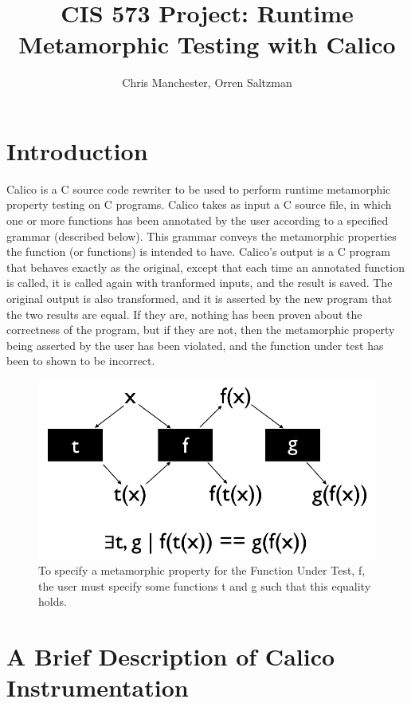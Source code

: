 \documentclass[notitlepage]{article}
\author{Chris Manchester, Orren Saltzman}
\title{CIS 573 Project: Runtime Metamorphic Testing with Calico}
\begin{document}
\maketitle

\section{Introduction}

Calico is a C source code rewriter to be used to perform runtime metamorphic property testing on C programs. Calico takes as input a C source file, in which one or more functions has been annotated by the user according to a specified grammar (described below). This grammar conveys the metamorphic properties the function (or functions) is intended to have. Calico's output is a C program that behaves exactly as the original, except that each time an annotated function is called, it is called again with tranformed inputs, and the result is saved. The original output is also transformed, and it is asserted by the new program that the two results are equal. If they are, nothing has been proven about the correctness of the program, but if they are not, then the metamorphic property being asserted by the user has been violated, and the function under test has been to shown to be incorrect.

\begin{figure}[ht!]
\centering
\includegraphics[width=175mm]{calico_pic1.png}
\caption{To specify a metamorphic property for the Function Under Test, f, the user must specify some functions t and g such that this equality holds.}
\end{figure}

\section{A Brief Description of Calico Instrumentation}
\end{document}
